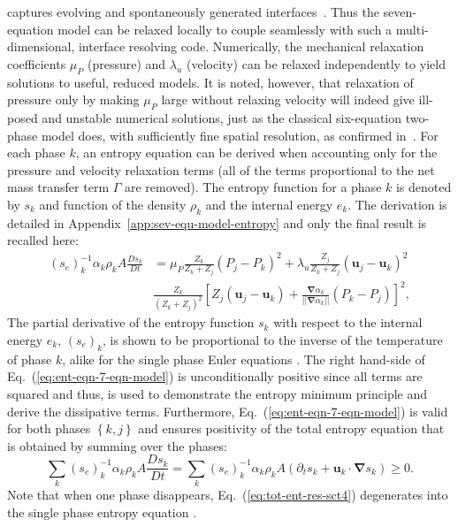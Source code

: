 \documentclass[preprint,10pt]{elsarticle}
\newcommand{\grad}{\mbold{\nabla}}
\newcommand{\mbold}[1]{\boldsymbol#1}
\newcommand{\eqt}[1]{Eq.~(\ref{#1})}                     %
\newcommand{\app}[1]{Appendix~\ref{#1}}                   %
\begin{document}
captures evolving and spontaneously generated
interfaces~\cite{Saurel_2009}. Thus the seven-equation model
can be relaxed locally to couple seamlessly with such a
multi-dimensional, interface resolving code. Numerically, the mechanical relaxation coefficients $\mu_P$
(pressure) and $\lambda_u$ (velocity) can be relaxed independently to
yield solutions to useful, reduced models.  It
is noted, however, that relaxation of pressure only by making $\mu_P$
large without relaxing velocity will indeed give ill-posed and
unstable numerical solutions, just as the classical six-equation
two-phase model does, with sufficiently fine spatial resolution, as
confirmed in~\cite{SEM,Herrard_2005}. For each phase $k$, an entropy equation can be derived when accounting only for the pressure and velocity relaxation terms (all of the terms proportional to the net mass transfer term $\Gamma$ are removed). The entropy function for a phase $k$ is denoted by $s_k$ and function of the density $\rho_k$ and the internal energy $e_k$. The derivation is detailed in \app{app:sev-equ-model-entropy} and only the final result is recalled here:
%
\begin{align}\label{eq:ent-eqn-7-eqn-model}
(s_{e})_k^{-1} \alpha_k \rho_k A \frac{Ds_k}{Dt} &= \mu_P \frac{Z_k}{Z_k+Z_j} (P_j - P_k)^2 + \lambda_u \frac{Z_j}{Z_k+Z_j} (\mbold u_j -\mbold  u_k)^2 \nonumber
\\
& \frac{Z_k}{\left( Z_k+Z_j \right)^2} \left[ Z_j (\mbold u_j-\mbold u_k)+\frac{\grad \alpha_k}{|| \grad \alpha_k ||}(P_k-P_j)\right]^2,
\end{align}
The partial derivative of the entropy function $s_k$ with respect to the internal energy $e_k$, $(s_e)_k$, is shown to be proportional to the inverse of the temperature of phase $k$, alike for the single phase Euler equations \cite{jlg, Marco_dissertation}. The right hand-side of \eqt{eq:ent-eqn-7-eqn-model} is unconditionally positive since all terms are squared and thus, is used to demonstrate the entropy minimum principle and derive the dissipative terms. Furthermore, \eqt{eq:ent-eqn-7-eqn-model} is valid for both phases $\left\{k, j\right\}$ and ensures positivity of the total entropy equation that is obtained by summing over the phases:
%
\begin{equation}\label{eq:tot-ent-res-sct4}
\sum_k (s_{e})_k^{-1} \alpha_k \rho_k A \frac{Ds_k}{Dt} = \sum_k (s_{e})_k^{-1} \alpha_k \rho_k A \left( \partial_t s_k + \mbold u_k \cdot \grad s_k \right) \geq 0 \nonumber .
\end{equation}
%
Note that when one phase disappears, \eqt{eq:tot-ent-res-sct4} degenerates into the single phase entropy equation \cite{SEM, Marco_dissertation}.
\end{document}
